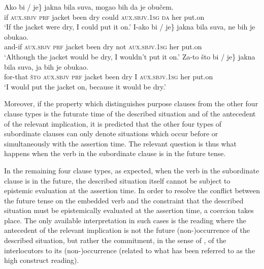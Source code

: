\documentclass[output=paper]{langscibook}
\begin{document}
{\ea\label{ex:Cond-both}
\ea \gll Ako \minsp{\{} bi / \minsp{*} je\} jakna bila suva, mogao bih da je obučem.\\
    if {} \textsc{aux.sbjv} {} {} \textsc{prf} jacket been dry could \textsc{aux.sbjv.1sg} \textsc{da} her put.on\\
    \glt `If the jacket were dry, I could put it on.'\label{ex:Cond-both-a}
\ex \gll I-ako \minsp{\{} bi / \minsp{*} je\} jakna bila suva, ne bih je obukao.\\
    and-if {} \textsc{aux.sbjv} {} {} \textsc{prf} jacket been dry not \textsc{aux.sbjv.1sg} her put.on\\
    \glt `Although the jacket would be dry, I wouldn't put it on.'\label{ex:Cond-both-b}
\ex \gll Za-to što \minsp{\{} bi / \minsp{*} je\} jakna bila suva, ja bih je obukao.\\
    for-that \textsc{što} {} \textsc{aux.sbjv} {} {} \textsc{prf} jacket been dry I \textsc{aux.sbjv.1sg} her put.on\\
    \glt `I would put the jacket on, because it would be dry.'\label{ex:Cond-both-c}
\z\z}

\ea\label{ex:Unreal-m-verb1}
\label{ex:Unreal-m-verb1-a}
\label{ex:Unreal-m-verb1-b}
\z\z

\noindent Moreover, if the property which distinguishes purpose clauses from the other four clause types is the futurate time of the described situation and of the antecedent of the relevant implication, it is predicted that the other four types of subordinate clauses can only denote situations which occur before or simultaneously with the assertion time. The relevant question is thus what happens when the verb in the subordinate clause is in the future tense.


In the remaining four clause types, as expected, when the verb in the subordinate clause is in the future, the described situation itself cannot be subject to epistemic evaluation at the assertion time. In order to resolve the conflict between the future tense on the embedded verb and the constraint that the described situation must be epistemically evaluated at the assertion time, a coercion takes place. The only available interpretation in such cases is the reading where the antecedent of the relevant implication is not the future (non-)occurrence of the described situation, but rather the commitment, in the sense of \citet{Krifka2015}, of the interlocutors to its (non-)occurrence (related to what has been referred to as the high construct reading).
\end{document}
